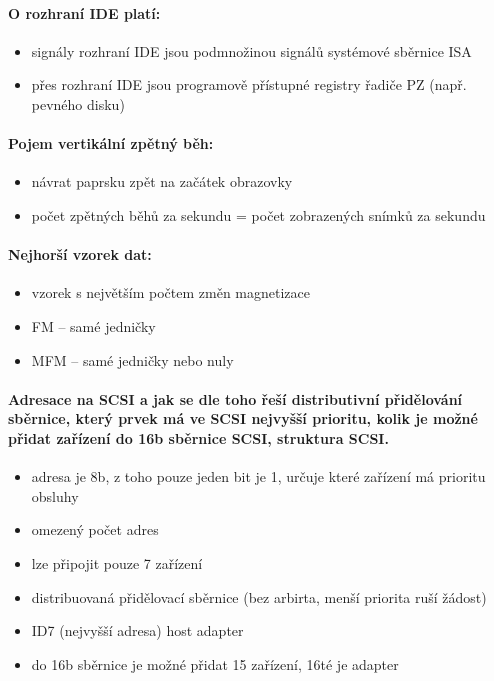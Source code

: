\documentclass[a5paper,10pt]{article}
\begin{document}
\paragraph{O rozhraní IDE platí:}
\begin{itemize}
	\item signály rozhraní IDE jsou podmnožinou signálů systémové sběrnice ISA
	\item přes rozhraní IDE	jsou programově přístupné registry řadiče PZ (např. pevného disku)
\end{itemize}

\paragraph{Pojem vertikální zpětný běh:}
\begin{itemize}
	\item návrat paprsku zpět na začátek obrazovky
	\item počet zpětných běhů za sekundu = počet zobrazených snímků za sekundu	
\end{itemize}

\paragraph{Nejhorší vzorek dat:}
\begin{itemize}
	\item vzorek s největším počtem změn magnetizace
	\item FM -- samé jedničky
	\item MFM -- samé jedničky nebo nuly 	
\end{itemize}

\paragraph{Adresace na SCSI a jak se dle toho řeší distributivní přidělování sběrnice, který prvek má ve SCSI nejvyšší prioritu, kolik je možné přidat zařízení do 16b sběrnice SCSI, struktura SCSI.}
\begin{itemize}
	\item adresa je 8b, z toho pouze jeden bit je 1, určuje které zařízení má prioritu obsluhy
	\item omezený počet adres
	\item lze připojit pouze 7 zařízení
	\item distribuovaná přidělovací sběrnice (bez arbirta, menší priorita ruší žádost)
	\item ID7 (nejvyšší adresa) host adapter
	\item do 16b sběrnice je možné přidat 15 zařízení, 16té je adapter
\end{itemize}
\end{document}

